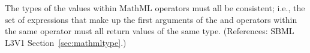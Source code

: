 The types of the values within MathML  operators must all
be consistent; i.e., the set of expressions that make up the first
arguments of the  and  operators within the
same  operator must all return values of the same type.
(References: SBML L3V1 Section~\ref{sec:mathmltype}.)
